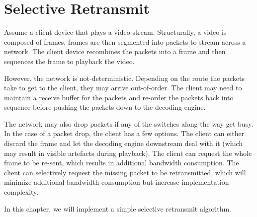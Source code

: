 
% 

\chapter{Selective Retransmit}

Assume a client device that plays a video stream. Structurally, a video is
composed of frames, frames are then segmented into packets to stream across a
network. The client device recombines the packets into a frame and then sequences the frame to playback the video.\newline

However, the network is not-deterministic. Depending on the route the packets take
to get to the client, they may arrive out-of-order. The client may need to
maintain a receive buffer for the packets and re-order the packets back into
sequence before pushing the packets down to the decoding engine.\newline

The network may also drop packets if any of the switches along the way get
busy. In the case of a packet drop, the client has a few options. The client can
either discard the frame and let the decoding engine downstream deal with it
(which may result in visible artefacts during playback). The client can
request the whole frame to be re-sent, which results in additional bandwidth consumption.  The client can selectively request the missing packet to be
retransmitted, which will minimize additional bandwidth consumption but
increase implementation complexity.\newline

In this chapter, we will implement a simple selective retransmit
algorithm.\newline

